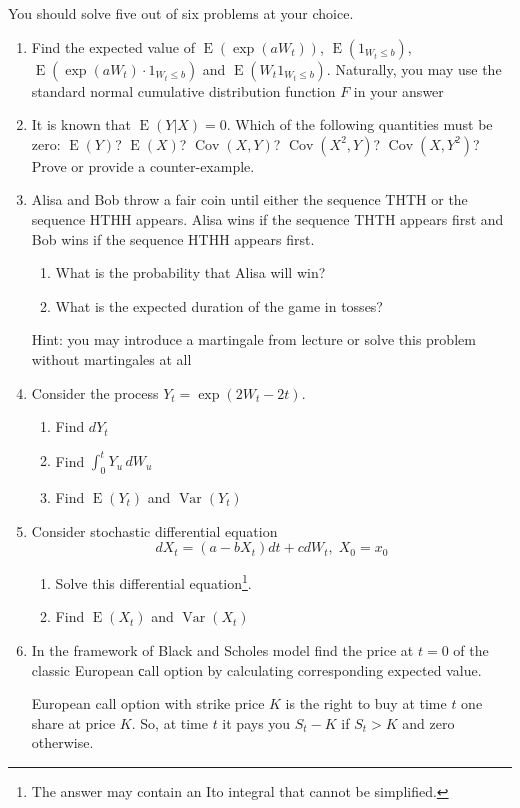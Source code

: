 \documentclass[12pt,a4paper]{article}
\DeclareMathOperator{\Cov}{Cov}
\DeclareMathOperator{\Var}{Var}
\DeclareMathOperator{\E}{E}
\begin{document}
You should solve five out of six problems at your choice.

\begin{enumerate}

\item Find the expected value of $\E(\exp(aW_t))$, $\E(1_{W_t\leq b})$, $\E(\exp(aW_t)\cdot 1_{W_t\leq b})$ and $\E(W_t 1_{W_t\leq b})$. Naturally, you may use the standard normal cumulative distribution function $F$ in your answer


\item It is known that $\E(Y|X)=0$. Which of the following quantities must be zero: $\E(Y)$? $\E(X)$? $\Cov(X,Y)$? $\Cov(X^2,Y)$? $\Cov(X,Y^2)$? Prove or provide a counter-example.

\item Alisa and Bob throw a fair coin until either the sequence THTH or the sequence HTHH appears. Alisa wins if the sequence THTH appears first and Bob wins if the sequence HTHH appears first.
\begin{enumerate}
\item What is the probability that Alisa will win?
\item What is the expected duration of the game in tosses?
\end{enumerate}

Hint: you may introduce a martingale from lecture or solve this problem without martingales at all

\item Consider the process $Y_t=\exp(2W_t-2t)$.

\begin{enumerate}
\item Find $dY_t$
\item Find $\int_0^t Y_u \, dW_u$
\item Find $\E(Y_t)$ and $\Var(Y_t)$
\end{enumerate}

\item Consider stochastic differential equation
\[
dX_t = (a - bX_t) dt + c dW_t, \; X_0=x_0
\]

\begin{enumerate}
\item Solve this differential equation\footnote{The answer may contain an Ito integral that cannot be simplified.}.
\item Find $\E(X_t)$ and $\Var(X_t)$
\end{enumerate}

\item In the framework of Black and Scholes model find the price at $t=0$ of the classic European сall option by calculating corresponding expected value.

European call option with strike price $K$ is the right to buy at time $t$ one share at price $K$. So, at time $t$ it pays you $S_t - K$ if $S_t > K$ and zero otherwise.

\end{enumerate}
\end{document}
